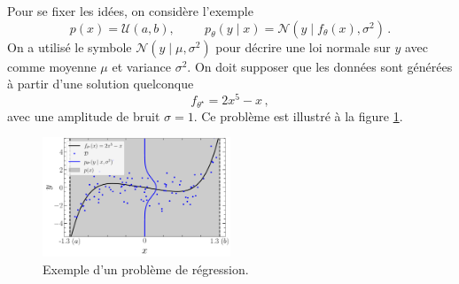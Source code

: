 Pour se fixer les idées, on considère l'exemple  
\begin{equation}\label{eq:loi generative}
        p(x) = \mathcal{U}(a, b), \hspace{1cm} p_\theta(y \mid x) = \mathcal{N}(y \mid f_\theta(x), \sigma^2)\, .
\end{equation}
On a utilisé le symbole $\mathcal{N}(y \mid \mu, \sigma^2)$ pour décrire une loi normale sur $y$ avec comme moyenne $\mu$ et variance $\sigma^2$. 
On doit supposer que les données sont générées à partir d'une solution quelconque 
\begin{equation}
        f_{\theta^{\star}} = 2x^5 - x\, ,
\end{equation}
avec une amplitude de bruit $\sigma=1$. Ce problème est illustré à la figure \ref{fig:toy problem}.
\begin{figure}[ht!]
        \centering
        \includegraphics[width=0.5\textwidth]{notebooks/toy_problem}
        \caption{Exemple d'un problème de régression.}
        \label{fig:toy problem}
\end{figure}

